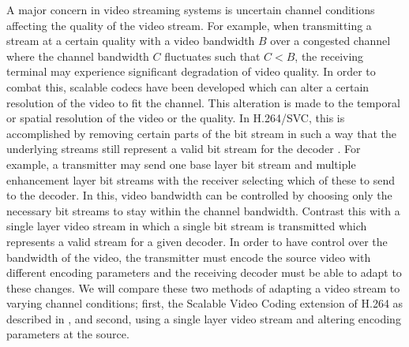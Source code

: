 \documentclass[a4paper,12pt]{article}
\begin{document}
A major concern in video streaming systems is uncertain channel conditions affecting the quality of the video stream. For example, when transmitting a stream at a certain quality with a video bandwidth $B$ over a congested channel where the channel bandwidth $C$ fluctuates such that $C < B$, the receiving terminal may experience significant degradation of video quality. In order to combat this, scalable codecs have been developed which can alter a certain resolution of the video to fit the channel. This alteration is made to the temporal or spatial resolution of the video or the quality. In H.264/SVC, this is accomplished by removing certain parts of the bit stream in such a way that the underlying streams still represent a valid bit stream for the decoder \cite{SVCOverview}. For example, a transmitter may send one base layer bit stream and multiple enhancement layer bit streams with the receiver selecting which of these to send to the decoder. In this, video bandwidth can be controlled by choosing only the necessary bit streams to stay within the channel bandwidth. Contrast this with a single layer video stream in which a single bit stream is transmitted which represents a valid stream for a given decoder. In order to have control over the bandwidth of the video, the transmitter must encode the source video with different encoding parameters and the receiving decoder must be able to adapt to these changes. We will compare these two methods of adapting a video stream to varying channel conditions; first, the Scalable Video Coding extension of H.264 as described in \cite{SVCOverview}, and second, using a single layer video stream and altering encoding parameters at the source. 
\end{document}
